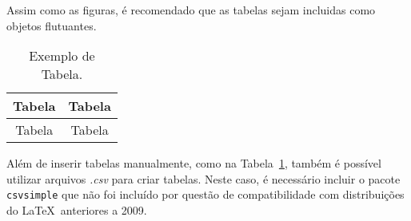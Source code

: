 Assim como as figuras, é recomendado que as tabelas sejam incluidas como
objetos flutuantes.
\begin{table}[!htb]
\caption{Exemplo de Tabela.}
\label{tab:exem}
\centering
\begin{tabular}{c|c}
Tabela & Tabela \\ \hline
Tabela & Tabela \\
\end{tabular}
\end{table}

Além de inserir tabelas manualmente, como na Tabela~\ref{tab:exem}, também é possível utilizar arquivos
\emph{.csv} para criar tabelas. Neste caso, é necessário incluir o pacote
\texttt{csvsimple} que não foi incluído por questão de compatibilidade com
distribuições do \LaTeX \ anteriores a 2009.
